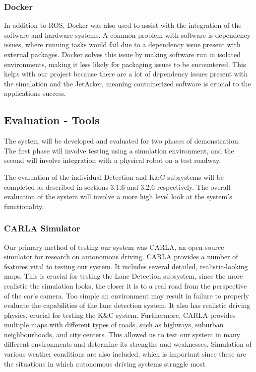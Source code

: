 \documentclass[titlepage,draft]{article}
\begin{document}
{\subsubsection{Docker}
In addition to ROS, Docker was also used to assist with the integration of the software and hardware systems. A common problem with software is dependency issues, where running tasks would fail due to a dependency issue present with external packages. Docker solves this issue by making software run in isolated environments, making it less likely for packaging issues to be encountered. This helps with our project because there are a lot of dependency issues present with the simulation and the JetAcker, meaning containerized software is crucial to the applications success.


\subsection{Evaluation - Tools}
The system will be developed and evaluated for two phases of demonstration. The first phase will involve testing using a simulation environment, and the second will involve integration with a physical robot on a test roadway.

The evaluation of the individual Detection and K\&C subsystems will be completed as described in sections 3.1.6 and 3.2.6 respectively. The overall evaluation of the system will involve a more high level look at the system’s functionality.

\subsubsection{CARLA Simulator}
Our primary method of testing our system was CARLA, an open-source simulator for research on autonomous driving. CARLA provides a number of features vital to testing our system. It includes several detailed, realistic-looking maps. This is crucial for testing the Lane Detection subsystem, since the more realistic the simulation looks, the closer it is to a real road from the perspective of the car's camera. Too simple an environment may result in failure to properly evaluate the capabilities of the lane detection system. It also has realistic driving physics, crucial for testing the K\&C system. Furthermore, CARLA provides multiple maps with different types of roads, such as highways, suburban neighbourhoods, and city centers. This allowed us to test our system in many different environments and determine its strengths and weaknesses. Simulation of various weather conditions are also included, which is important since these are the situations in which autonomous driving systems struggle most.

}
\end{document}
